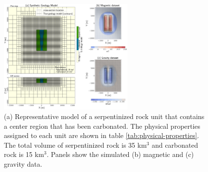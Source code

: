 \begin{figure}[!htb]
    \begin{center}
    \includegraphics[width=0.6\textwidth]{figures/synthetic-three-blocks-model.png}
    \end{center}
\caption{
    (a) Representative model of a serpentinized rock unit that contains a center region that has been carbonated. The physical properties assigned to each unit are shown in table \ref{tab:physical-properties}. The total volume of serpentinized rock is 35 km$^3$ and carbonated rock is 15 km$^3$. Panels show the simulated (b) magnetic and (c) gravity data.
}
\label{fig:representative-model}
\end{figure}
